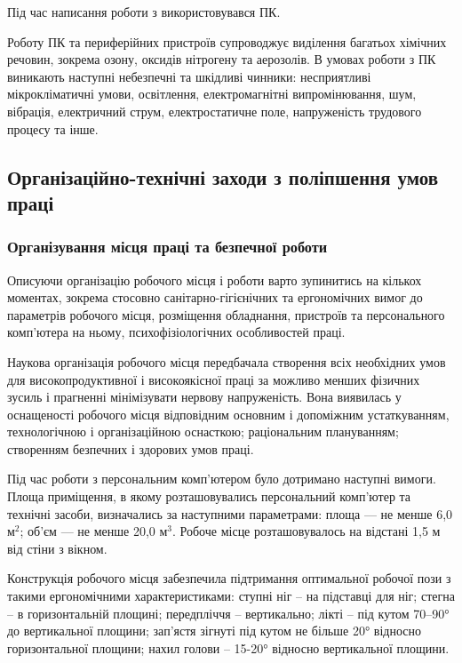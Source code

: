Під час написання роботи з використовувався ПК.

Роботу ПК та периферійних пристроїв супроводжує виділення багатьох хімічних речовин, зокрема озону, оксидів  нітрогену та аерозолів. В умовах роботи з ПК виникають наступні небезпечні та шкідливі чинники: несприятливі мікрокліматичні умови, освітлення, електромагнітні випромінювання, шум, вібрація, електричний струм, електростатичне поле, напруженість трудового процесу та інше.

\subsection{Організаційно-технічні заходи з поліпшення умов праці}

\subsubsection{Організування місця праці та безпечної роботи}

Описуючи організацію робочого місця і роботи варто зупинитись на кількох моментах, зокрема стосовно санітарно-гігієнічних та ергономічних вимог до параметрів робочого місця, розміщення обладнання, пристроїв та персонального комп’ютера на ньому, психофізіологічних особливостей праці.

Наукова організація робочого місця передбачала створення всіх необхідних умов для високопродуктивної і високоякісної праці за можливо менших фізичних зусиль і прагненні мінімізувати нервову напруженість. Вона виявилась у оснащеності робочого місця відповідним основним і допоміжним устаткуванням, технологічною і організаційною оснасткою; раціональним плануванням; створенням безпечних і здорових умов праці.

Під час роботи з персональним комп’ютером було дотримано наступні вимоги.
Площа приміщення, в якому розташовувались персональний комп’ютер та технічні засоби, визначались за наступними параметрами: площа — не менше 6,0 м$^2$; об’єм — не менше 20,0 м$^3$. Робоче місце розташовувалось на відстані 1,5 м від стіни з вікном.

Конструкція робочого місця забезпечила підтримання оптимальної робочої пози з такими ергономічними характеристиками:  ступні ніг – на підставці для ніг; стегна – в горизонтальній площині; передпліччя –  вертикально;  лікті – під кутом 70–90° до вертикальної площини; зап’ястя зігнуті під кутом не більше 20° відносно горизонтальної площини; нахил голови – 15-20° відносно вертикальної площини.

